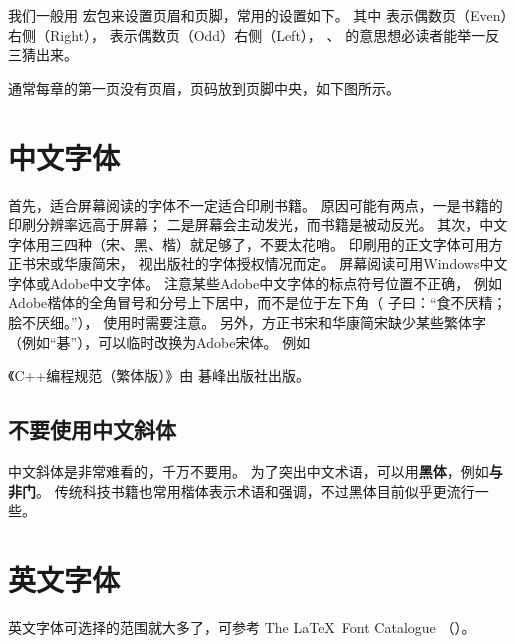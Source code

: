 \vspace{1ex}
我们一般用  宏包来设置页眉和页脚，常用的设置如下。
其中  表示偶数页\linebreak（Even）右侧（Right），
 表示偶数页（Odd）右侧（Left），
、 的意思想必读者能举一反三猜出来。
\begin{Code}
\pagestyle{fancy}
\fancyhf{}
\fancyhead[RE]{\normalfont\small\rmfamily\nouppercase{\leftmark}}
\fancyhead[LO]{\normalfont\small\rmfamily\nouppercase{\rightmark}}
\fancyhead[LE,RO]{\thepage}
\end{Code}

通常每章的第一页没有页眉，页码放到页脚中央，如下图所示。

\vspace{1ex}
\centerline{}

\section{中文字体} %

首先，适合屏幕阅读的字体不一定适合印刷书籍。
原因可能有两点，一是书籍的印刷分辨率远高于屏幕；
二是屏幕会主动发光，而书籍是被动反光。
其次，中文字体用三四种（宋、黑、楷）就足够了，不要太花哨。
印刷用的正文字体可用方正书宋或华康简宋，
视出版社的字体授权情况而定。
屏幕阅读可用Windows中文字体或Adobe中文字体。
注意某些Adobe中文字体的标点符号位置不正确，
例如Adobe楷体的全角冒号和分号上下居中，而不是位于左下角（
{子曰：“食不厌精；脍不厌细。”}），
使用时需要注意。
另外，方正书宋和华康简宋缺少某些繁体字（例如“碁”），可以临时改换为Adobe宋体。
例如
\begin{Code}
《C++编程规范（繁体版）》由{ 碁峰}出版社出版。
\end{Code}


\subsection{不要使用中文斜体}
中文斜体是非常难看的，千万不要用。
为了突出中文术语，可以用\textbf{黑体}，例如\textbf{与非门}。
传统科技书籍也常用{\kaishu 楷体}表示术语和强调，不过黑体目前似乎更流行一些。

\section{英文字体} %
英文字体可选择的范围就大多了，可参考
The \LaTeX\ Font Catalogue （）。

